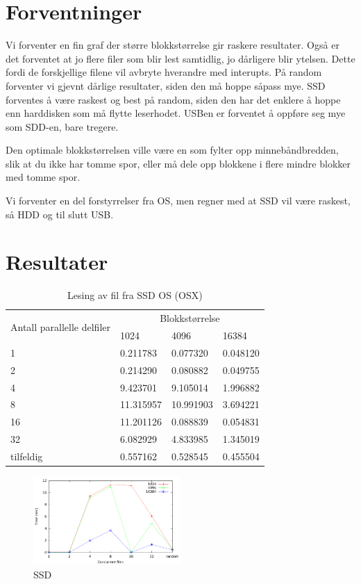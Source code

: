 \documentclass[titlepage]{article}
\begin{document}
\section{Forventninger}
Vi forventer en fin graf der større blokkstørrelse gir raskere resultater.
Også er det forventet at jo flere filer som blir lest samtidlig, jo dårligere blir ytelsen. Dette fordi de forskjellige filene vil avbryte hverandre med interupts.
På random forventer vi gjevnt dårlige resultater, siden den må hoppe såpass mye.
SSD forventes å være raskest og best på random, siden den har det enklere å hoppe enn harddisken som må flytte leserhodet. USBen er forventet å oppføre seg mye som SDD-en, bare tregere.

Den optimale blokkstørrelsen ville være en som fylter opp minnebåndbredden, slik at du ikke har tomme spor, eller må dele opp blokkene i flere mindre blokker med tomme spor.

Vi forventer en del forstyrrelser fra OS, men regner med at SSD vil være raskest, så HDD og til slutt USB.


\section{Resultater}

\begin{table}[h!]
\caption{Lesing av fil fra SSD OS (OSX)}
\label{SSD}
\centering
\begin{tabular}{|l|l|l|l|}
\hline
\multirow{2}{*}{ Antall parallelle delfiler} & \multicolumn{3}{|c|}{Blokkstørrelse} \\
 & 1024 & 4096 & 16384\\
\hline
1         &  0.211783  &  0.077320  & 0.048120 \\
2         &  0.214290  &  0.080882  & 0.049755 \\
4         &  9.423701  &  9.105014  & 1.996882 \\
8         & 11.315957  & 10.991903  & 3.694221 \\
16        & 11.201126  &  0.088839  & 0.054831 \\
32        &  6.082929  &  4.833985  & 1.345019 \\
tilfeldig &  0.557162  &  0.528545  & 0.455504 \\
\hline
\end{tabular}
\end{table}

\begin{figure}[h!]
  \caption{SSD}
  \label{fig:sdd}
  \centering
  \includegraphics[width=0.5\textwidth]{res/result-sdd}
\end{figure}
\end{document}
